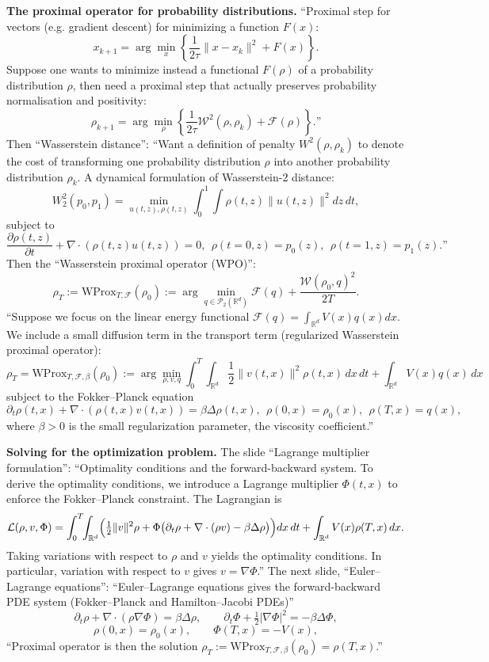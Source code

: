 \medskip\noindent
{\bf The proximal operator for probability
distributions.}
``Proximal step for vectors (e.g. gradient
descent) for minimizing a function $F(x)$:
$$
x_{k+1}=\arg\min_x\left\{\frac{1}{2\tau}
\|x-x_k\|^2+F(x)\right\}.
$$
Suppose one wants to minimize instead a
functional $F(\rho)$ of a probability
distribution $\rho$, then need a proximal step
that actually preserves probability
normalisation and positivity:
$$
\rho_{k+1}=\arg\min_\rho\left\{\frac{1}{2\tau}
\mathcal{W}^2(\rho,\rho_k)
+\mathcal{F}(\rho)\right\}.\text{''}
$$
Then ``Wasserstein distance'': ``Want a
definition of penalty $W^2(\rho,\rho_k)$ to
denote the cost of transforming one
probability distribution $\rho$ into another
probability distribution $\rho_k$. A dynamical
formulation of Wasserstein-2 distance:
$$
W_2^2(p_0,p_1)=\min_{u(t,z),\rho(t,z)}
\int_0^1\!\!\int\rho(t,z)\|u(t,z)\|^2
dz\,dt,
$$
subject to
$$
\frac{\partial\rho(t,z)}{\partial t}
+\nabla\cdot(\rho(t,z)u(t,z))=0,
\ \ \rho(t=0,z)=p_0(z),
\ \ \rho(t=1,z)=p_1(z).\text{''}
$$
Then the ``Wasserstein proximal operator
(WPO)'':
$$
\rho_T:=\mathrm{WProx}_{T,\mathcal{F}}
(\rho_0):=\arg\min_{q\in\mathcal{P}_2
(\mathbb{R}^d)}\mathcal{F}(q)
+\frac{\mathcal{W}(\rho_0,q)^2}{2T}.
$$
``Suppose we focus on the linear energy
functional $\mathcal{F}(q)=\int_{\mathbb{R}^d}
V(x)q(x)dx$. We include a small diffusion term
in the transport term (regularized Wasserstein
proximal operator):
$$
\rho_T=\mathrm{WProx}_{T,\mathcal{F},\beta}
(\rho_0):=\arg\min_{\rho,v,q}
\int_0^T\!\!\int_{\mathbb{R}^d}\frac12
\|v(t,x)\|^2\rho(t,x)\,dx\,dt
+\int_{\mathbb{R}^d}V(x)q(x)\,dx
$$
subject to the Fokker--Planck equation
$$
\partial_t\rho(t,x)+\nabla\cdot(\rho(t,x)
v(t,x))=\beta\Delta\rho(t,x),
\ \ \rho(0,x)=\rho_0(x),
\ \ \rho(T,x)=q(x),
$$
where $\beta>0$ is the small regularization
parameter, the viscosity coefficient.''

\medskip\noindent
{\bf Solving for the optimization problem.}
The slide ``Lagrange multiplier
formulation'': ``Optimality conditions and
the forward-backward system. To derive the
optimality conditions, we introduce a
Lagrange multiplier $\Phi(t,x)$ to enforce
the Fokker--Planck constraint. The Lagrangian
is
$$
\mathcal{L}(\rho,v,\Phi)=\int_0^T\!\!
\int_{\mathbb{R}^d}\Bigl(\tfrac12\|v\|^2\rho
+\Phi\bigl(\partial_t\rho+\nabla\cdot(\rho v)
-\beta\Delta\rho\bigr)\Bigr)dx\,dt
+\int_{\mathbb{R}^d}V(x)\rho(T,x)\,dx.
$$
Taking variations with respect to $\rho$ and
$v$ yields the optimality conditions. In
particular, variation with respect to $v$
gives $v=\nabla\Phi$.'' The next slide,
``Euler--Lagrange equations'': ``Euler--Lagrange
equations gives the forward-backward PDE
system (Fokker--Planck and Hamilton--Jacobi
PDEs)''
$$
\partial_t\rho+\nabla\cdot(\rho\nabla\Phi)
=\beta\Delta\rho,
\qquad
\partial_t\Phi+\tfrac12|\nabla\Phi|^2
=-\beta\Delta\Phi,
$$
$$
\rho(0,x)=\rho_0(x),
\qquad
\Phi(T,x)=-V(x),
$$
``Proximal operator is then the solution
$\rho_T:=\mathrm{WProx}_{T,\mathcal{F},\beta}
(\rho_0)=\rho(T,x)$.''

